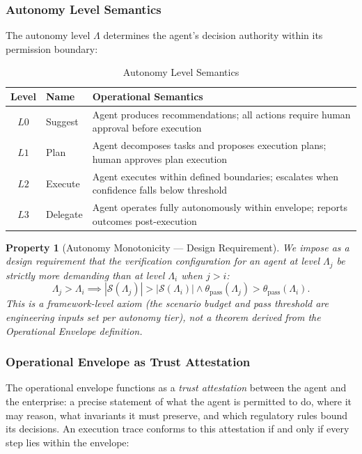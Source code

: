 \documentclass[11pt,a4paper]{article}
\newtheorem{property}{Property}[section]
\newcommand{\scenario}{\mathcal{S}}
\begin{document}
\subsubsection{Autonomy Level Semantics}

The autonomy level $\Lambda$ determines the agent's decision authority
within its permission boundary:

\begin{table}[htbp]
\centering
\caption{Autonomy Level Semantics}
\label{tab:autonomy-levels}
\begin{tabular}{@{}clp{6cm}@{}}
\toprule
\textbf{Level} & \textbf{Name} & \textbf{Operational Semantics} \\
\midrule
$L0$ & Suggest & Agent produces recommendations; all actions require
  human approval before execution \\
$L1$ & Plan & Agent decomposes tasks and proposes execution plans;
  human approves plan execution \\
$L2$ & Execute & Agent executes within defined boundaries; escalates
  when confidence falls below threshold \\
$L3$ & Delegate & Agent operates fully autonomously within envelope;
  reports outcomes post-execution \\
\bottomrule
\end{tabular}
\end{table}

\begin{property}[Autonomy Monotonicity --- Design Requirement]
\label{prop:autonomy-monotonicity}
  We impose as a design requirement that the verification configuration for an agent at level $\Lambda_j$ be strictly more demanding than at level $\Lambda_i$ when $j > i$:
  \begin{equation}
    \Lambda_j > \Lambda_i \implies |\scenario(\Lambda_j)| >
      |\scenario(\Lambda_i)| \wedge \theta_{\text{pass}}(\Lambda_j) >
      \theta_{\text{pass}}(\Lambda_i).
  \end{equation}
  This is a framework-level axiom (the scenario budget and pass threshold are engineering inputs set per autonomy tier), not a theorem derived from the Operational Envelope definition.
\end{property}

\subsubsection{Operational Envelope as Trust Attestation}

The operational envelope functions as a \emph{trust attestation} between
the agent and the enterprise: a precise statement of what the agent
is permitted to do, where it may reason, what invariants it must
preserve, and which regulatory rules bound its decisions. An execution
trace conforms to this attestation if and only if every step lies
within the envelope:
\end{document}
